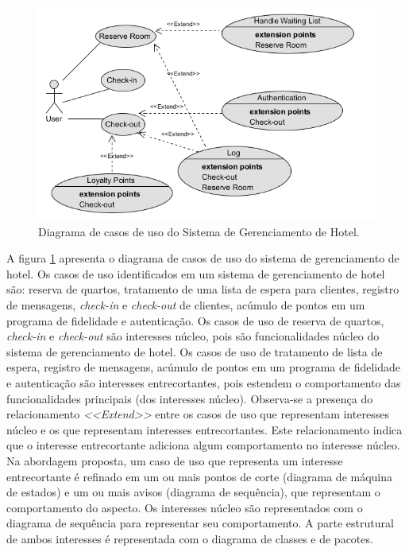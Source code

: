   \begin{figure}[!h]
	\centering
	\includegraphics{img/case_study_use_cases.png}
	\caption{Diagrama de casos de uso do Sistema de Gerenciamento de Hotel.}\label{fig:case_study_use_cases}
  \end{figure}

A figura \ref{fig:case_study_use_cases} apresenta o diagrama de casos de uso do sistema de gerenciamento de hotel. Os casos de uso identificados em um sistema de 
gerenciamento de hotel são: reserva de quartos, tratamento de uma lista de espera para clientes, registro de mensagens, \textit{check-in} e
\textit{check-out} de clientes, acúmulo de pontos em um programa de fidelidade e autenticação. Os casos de uso de reserva de quartos,
\textit{check-in} e \textit{check-out} são interesses núcleo, pois são funcionalidades núcleo do sistema de gerenciamento de hotel. Os casos de uso de 
tratamento de lista de espera, registro de mensagens, acúmulo de pontos em um programa de fidelidade e autenticação são interesses entrecortantes,
pois estendem o comportamento das funcionalidades principais (dos interesses núcleo). Observa-se a presença do relacionamento \textit{<<Extend>>}
entre os casos de uso que representam interesses núcleo e os que representam interesses entrecortantes. Este relacionamento indica que o interesse
entrecortante adiciona algum comportamento no interesse núcleo. Na abordagem proposta, um caso de uso que representa um interesse entrecortante é
refinado em um ou mais pontos de corte (diagrama de máquina de estados) e um ou mais avisos (diagrama de sequência), que representam o comportamento
do aspecto. Os interesses núcleo são representados com o diagrama de sequência para representar seu comportamento. A parte estrutural de ambos
interesses é representada com o diagrama de classes e de pacotes.

